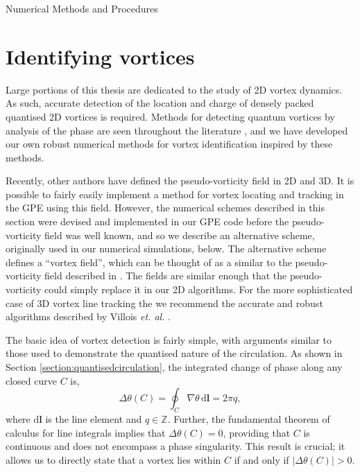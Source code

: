 \begin{chapter}{\label{cha:numerics}Numerical Methods and Procedures}
  

\section{\label{section:vortexidentifying} Identifying vortices}
Large portions of this thesis are dedicated to the study of 2D vortex dynamics. As such, accurate detection of the location and charge of densely packed quantised 2D vortices is required. Methods for detecting quantum vortices by analysis of the phase are seen throughout the literature \cite{Simula,saito10,white12,reeves_billam_13,reeves,white_anderson_14,PhysRevLett.113.165302,reeves_2015}, and we have developed our own robust numerical methods for vortex identification inspired by these methods.

Recently, other authors have defined the pseudo-vorticity field \cite{Kerr14,Villois16} in 2D and 3D. It is possible to fairly easily implement a method for vortex locating and tracking in the GPE using this field. However, the numerical schemes described in this section were devised and implemented in our GPE code before the pseudo-vorticity field was well known, and so we describe an alternative scheme, originally used in our numerical simulations, below. The alternative scheme defines a ``vortex field'', which can be thought of as a similar to the pseudo-vorticity field described in \cite{Kerr14,Villois16}. The fields are similar enough that the pseudo-vorticity could simply replace it in our 2D algorithms. For the more sophisticated case of 3D vortex line tracking the we recommend the accurate and robust algorithms described by Villois {\it et. al.} \cite{Villois16}.

The basic idea of vortex detection is fairly simple, with arguments similar to those used to demonstrate the quantised nature of the circulation. As shown in Section \ref{section:quantisedcirculation}, the integrated change of phase along any closed curve $C$ is,
\begin{equation}
  \Delta\theta(C) = \oint_C \! \nabla \theta  \, \mathrm{d}\mathbf{l} = 2\pi q,
\end{equation}
where $\mathrm{d}\mathbf{l}$ is the line element and $q\in\mathbb{Z}$. Further, the fundamental theorem of calculus for line integrals \cite{larson2013multivariable} implies that $\Delta\theta(C) = 0$, providing that $C$ is continuous and does not encompass a phase singularity. This result is crucial; it allows us to directly state that a vortex lies within $C$ if and only if $|\Delta\theta(C)| > 0 $.


\end{chapter}
